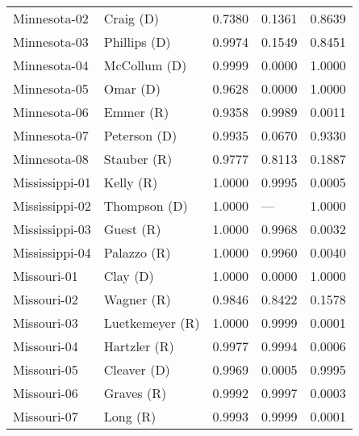 \begin{longtable}{llrll}
      Minnesota-02 &            {\color{Blue} Craig (D)} &       0.7380 &        0.1361 &        0.8639 \\
      Minnesota-03 &         {\color{Blue} Phillips (D)} &       0.9974 &        0.1549 &        0.8451 \\
      Minnesota-04 &         {\color{Blue} McCollum (D)} &       0.9999 &        0.0000 &        1.0000 \\
      Minnesota-05 &             {\color{Blue} Omar (D)} &       0.9628 &        0.0000 &        1.0000 \\
      Minnesota-06 &             {\color{Red} Emmer (R)} &       0.9358 &        0.9989 &        0.0011 \\
      Minnesota-07 &         {\color{Blue} Peterson (D)} &       0.9935 &        0.0670 &        0.9330 \\
      Minnesota-08 &           {\color{Red} Stauber (R)} &       0.9777 &        0.8113 &        0.1887 \\
    Mississippi-01 &             {\color{Red} Kelly (R)} &       1.0000 &        0.9995 &        0.0005 \\
    Mississippi-02 &         {\color{Blue} Thompson (D)} &       1.0000 &           --- &        1.0000 \\
    Mississippi-03 &             {\color{Red} Guest (R)} &       1.0000 &        0.9968 &        0.0032 \\
    Mississippi-04 &           {\color{Red} Palazzo (R)} &       1.0000 &        0.9960 &        0.0040 \\
       Missouri-01 &             {\color{Blue} Clay (D)} &       1.0000 &        0.0000 &        1.0000 \\
       Missouri-02 &            {\color{Red} Wagner (R)} &       0.9846 &        0.8422 &        0.1578 \\
       Missouri-03 &       {\color{Red} Luetkemeyer (R)} &       1.0000 &        0.9999 &        0.0001 \\
       Missouri-04 &          {\color{Red} Hartzler (R)} &       0.9977 &        0.9994 &        0.0006 \\
       Missouri-05 &          {\color{Blue} Cleaver (D)} &       0.9969 &        0.0005 &        0.9995 \\
       Missouri-06 &            {\color{Red} Graves (R)} &       0.9992 &        0.9997 &        0.0003 \\
       Missouri-07 &              {\color{Red} Long (R)} &       0.9993 &        0.9999 &        0.0001 \\

\end{longtable}

